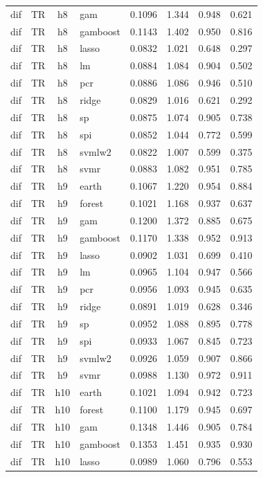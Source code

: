 \begin{ThreePartTable}
\begin{longtable}[t]{llclcccc}
dif & TR & h8 & gam & 0.1096 & 1.344 & 0.948 & 0.621\\
dif & TR & h8 & gamboost & 0.1143 & 1.402 & 0.950 & 0.816\\
dif & TR & h8 & lasso & 0.0832 & 1.021 & 0.648 & 0.297\\
dif & TR & h8 & lm & 0.0884 & 1.084 & 0.904 & 0.502\\
dif & TR & h8 & pcr & 0.0886 & 1.086 & 0.946 & 0.510\\
dif & TR & h8 & ridge & 0.0829 & 1.016 & 0.621 & 0.292\\
dif & TR & h8 & sp & 0.0875 & 1.074 & 0.905 & 0.738\\
dif & TR & h8 & spi & 0.0852 & 1.044 & 0.772 & 0.599\\
dif & TR & h8 & svmlw2 & 0.0822 & 1.007 & 0.599 & 0.375\\
dif & TR & h8 & svmr & 0.0883 & 1.082 & 0.951 & 0.785\\
\addlinespace
dif & TR & h9 & earth & 0.1067 & 1.220 & 0.954 & 0.884\\
dif & TR & h9 & forest & 0.1021 & 1.168 & 0.937 & 0.637\\
dif & TR & h9 & gam & 0.1200 & 1.372 & 0.885 & 0.675\\
dif & TR & h9 & gamboost & 0.1170 & 1.338 & 0.952 & 0.913\\
dif & TR & h9 & lasso & 0.0902 & 1.031 & 0.699 & 0.410\\
dif & TR & h9 & lm & 0.0965 & 1.104 & 0.947 & 0.566\\
dif & TR & h9 & pcr & 0.0956 & 1.093 & 0.945 & 0.635\\
dif & TR & h9 & ridge & 0.0891 & 1.019 & 0.628 & 0.346\\
dif & TR & h9 & sp & 0.0952 & 1.088 & 0.895 & 0.778\\
dif & TR & h9 & spi & 0.0933 & 1.067 & 0.845 & 0.723\\
dif & TR & h9 & svmlw2 & 0.0926 & 1.059 & 0.907 & 0.866\\
dif & TR & h9 & svmr & 0.0988 & 1.130 & 0.972 & 0.911\\
\addlinespace
dif & TR & h10 & earth & 0.1021 & 1.094 & 0.942 & 0.723\\
dif & TR & h10 & forest & 0.1100 & 1.179 & 0.945 & 0.697\\
dif & TR & h10 & gam & 0.1348 & 1.446 & 0.905 & 0.784\\
dif & TR & h10 & gamboost & 0.1353 & 1.451 & 0.935 & 0.930\\
dif & TR & h10 & lasso & 0.0989 & 1.060 & 0.796 & 0.553\\

\end{longtable}
\end{ThreePartTable}
